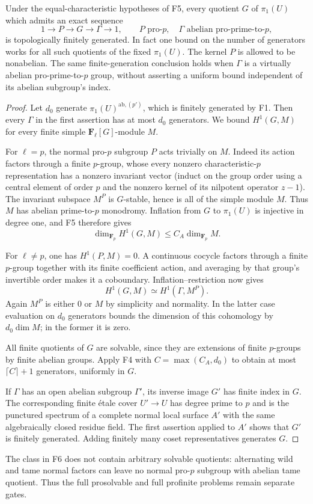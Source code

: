 \begin{corollary}
Under the equal-characteristic hypotheses of F5, every quotient $G$
of $\pi_1(U)$ which admits an exact sequence
\[
 1\longrightarrow P\longrightarrow G\longrightarrow\Gamma
 \longrightarrow1,
 \qquad P\text{ pro-}p,\quad
 \Gamma\text{ abelian pro-prime-to-}p,
\]
is topologically finitely generated. In fact one bound on the number
of generators works for all such quotients of the fixed $\pi_1(U)$.
The kernel $P$ is allowed to be nonabelian. The same finite-generation
conclusion holds when $\Gamma$ is a virtually abelian pro-prime-to-$p$
group, without asserting a uniform bound independent of its abelian
subgroup's index.
\end{corollary}
\begin{proof}
Let $d_0$ generate $\pi_1(U)^{\mathrm{ab},(p')}$, which is finitely
generated by F1. Then every $\Gamma$ in the first assertion has at
most $d_0$ generators. We bound $H^1(G,M)$ for every finite simple
$\mathbf F_\ell[G]$-module $M$.

For $\ell=p$, the normal pro-$p$ subgroup $P$ acts trivially on $M$.
Indeed its action factors through a finite $p$-group, whose every
nonzero characteristic-$p$ representation has a nonzero invariant
vector (induct on the group order using a central element of order
$p$ and the nonzero kernel of its nilpotent operator $z-1$).
The invariant subspace $M^P$ is $G$-stable, hence is all of the
simple module $M$. Thus $M$ has abelian prime-to-$p$ monodromy.
Inflation from $G$ to $\pi_1(U)$ is injective in degree one, and F5
therefore gives
\[
 \dim_{\mathbf F_p}H^1(G,M)\leq C_A\dim_{\mathbf F_p}M.
\]

For $\ell\ne p$, one has $H^1(P,M)=0$. A continuous cocycle factors
through a finite $p$-group together with its finite coefficient
action, and averaging by that group's invertible order makes it a
coboundary. Inflation--restriction now gives
\[
 H^1(G,M)\simeq H^1(\Gamma,M^P).
\]
Again $M^P$ is either $0$ or $M$ by simplicity and normality. In the
latter case evaluation on $d_0$ generators bounds the dimension of
this cohomology by $d_0\dim M$; in the former it is zero.

All finite quotients of $G$ are solvable, since they are extensions
of finite $p$-groups by finite abelian groups. Apply F4 with
$C=\max(C_A,d_0)$ to obtain at most $\lceil C\rceil+1$ generators,
uniformly in $G$.

If $\Gamma$ has an open abelian subgroup $\Gamma'$, its inverse
image $G'$ has finite index in $G$. The corresponding finite \'etale
cover $U'\to U$ has degree prime to $p$ and is the punctured spectrum
of a complete normal local surface $A'$ with the same algebraically
closed residue field. The first assertion applied to $A'$ shows
that $G'$ is finitely generated. Adding finitely many coset
representatives generates $G$.
\end{proof}

The class in F6 does not contain arbitrary solvable quotients:
alternating wild and tame normal factors can leave no normal
pro-$p$ subgroup with abelian tame quotient. Thus the full
prosolvable and full profinite problems remain separate gates.

